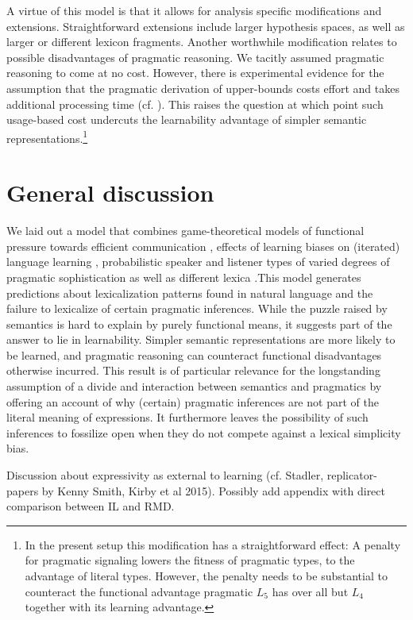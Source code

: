 \documentclass[a4paper]{article}
\begin{document}
A virtue of this model is that it allows for analysis specific modifications and extensions. Straightforward extensions include larger hypothesis spaces, as well as larger or different lexicon fragments. Another worthwhile modification relates to possible disadvantages of pragmatic reasoning. We tacitly assumed pragmatic reasoning to come at no cost. However, there is experimental evidence for the assumption that the pragmatic derivation of upper-bounds costs effort and takes additional processing time (cf. \citealt{deNeys+schaeken:2007, huang+snedeker:2009}). This raises the question at which point such usage-based cost undercuts the learnability advantage of simpler semantic representations.\footnote{In the present setup this modification has a straightforward effect: A penalty for pragmatic signaling lowers the fitness of pragmatic types, to the advantage of literal types. However, the penalty needs to be substantial to counteract the functional advantage pragmatic $L_5$ has over all but $L_4$ together with its learning advantage.}


\section{General discussion}
We laid out a model that combines game-theoretical models of functional pressure towards efficient communication \citep{nowak+krakauer:1999}, effects of learning biases on (iterated) language learning \citep{griffiths+kalish:2007}, probabilistic speaker and listener types of varied degrees of pragmatic sophistication \citep{frank+goodman:2012, franke+jaeger:2014} as well as different lexica \citep{bergen+etal:2012,bergen+etal:2016}.This model generates predictions about  lexicalization patterns found in natural language and the failure to lexicalize of certain pragmatic inferences. While the puzzle raised by semantics is hard to explain by purely functional means, it suggests part of the answer to lie in learnability. Simpler semantic representations are more likely to be learned, and pragmatic reasoning can counteract functional disadvantages otherwise incurred. This result is of particular relevance for the longstanding assumption of a divide and interaction between semantics and pragmatics by offering an account of why (certain) pragmatic inferences are not part of the literal meaning of expressions. It furthermore leaves the possibility of such inferences to fossilize open when they do not compete against a lexical simplicity bias.

Discussion about expressivity as external to learning (cf. Stadler, replicator-papers by Kenny Smith, Kirby et al 2015). Possibly add appendix with direct comparison between IL and RMD.
\end{document}
